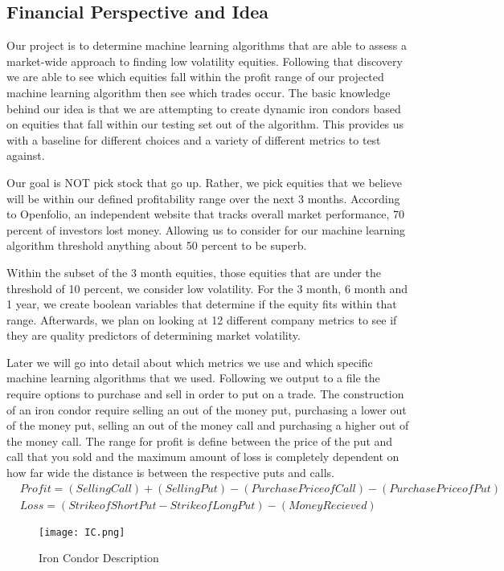 \documentclass[paper=letter, fontsize=11pt]{scrartcl}
\numberwithin{equation}{section}		%
\numberwithin{figure}{section}			%
\numberwithin{table}{section}				%
\begin{document}
\begin{spacing}{2}
\subsection{Financial Perspective and Idea}
Our project is to determine machine learning algorithms that are able to assess a market-wide approach to finding low volatility equities. Following that discovery we are able to see which equities fall within the profit range of our projected machine learning algorithm then see which trades occur. The basic knowledge behind our idea is that we are attempting to create dynamic iron condors based on equities that fall within our testing set out of the algorithm. This provides us with a baseline for different choices and a variety of different metrics to test against.

Our goal is NOT pick stock that go up. Rather, we pick equities that we believe will be within our defined profitability range over the next 3 months. According to Openfolio, an independent website that tracks overall market performance, 70 percent of investors lost money. Allowing us to consider for our machine learning algorithm threshold anything about 50 percent to be superb\cite{Openfolio}.  

Within the subset of the 3 month equities, those equities that are under the threshold of 10 percent, we consider low volatility. For the 3 month, 6 month and 1 year, we create boolean variables that determine if the equity fits within that range. Afterwards, we plan on looking at 12 different company metrics to see if they are quality predictors of determining market volatility. 

Later we will go into detail about which metrics we use and which specific machine learning algorithms that we used. Following we output to a file the require options to purchase and sell in order to put on a trade. The construction of an iron condor require selling an out of the money put, purchasing a lower out of the money put, selling an out of the money call and purchasing a higher out of the money call. The range for profit is define between the price of the put and call that you sold and the maximum amount of loss is completely dependent on how far wide the distance is between the respective puts and calls.                                                                  
\begin{align*}
&Profit = (Selling Call) + (Selling Put) -(Purchase Price of Call) - (Purchase Price of Put)&\\
&Loss = (Strike of Short Put - Strike of Long Put) - (Money Recieved)& 
\end{align*}
\begin{figure}
\centering
\texttt{[image: IC.png]}
\caption{Iron Condor Description}
\end{figure}

\end{spacing}
\end{document}
